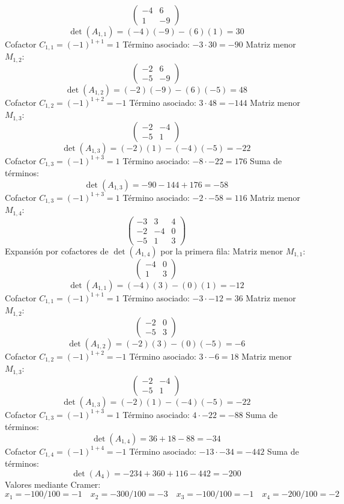\documentclass{article}
\begin{document}
\[\begin{pmatrix}-4 & 6 \\ 1 & -9\end{pmatrix}\]
\[\det(A_{1,1}) = (-4)(-9) - (6)(1) = 30\]
Cofactor $C_{1,1} = (-1)^{1+1} = 1$
Término asociado: $ -3 \cdot 30 = -90 $
Matriz menor $M_{1,2}$:
\[\begin{pmatrix}-2 & 6 \\ -5 & -9\end{pmatrix}\]
\[\det(A_{1,2}) = (-2)(-9) - (6)(-5) = 48\]
Cofactor $C_{1,2} = (-1)^{1+2} = -1$
Término asociado: $ 3 \cdot 48 = -144 $
Matriz menor $M_{1,3}$:
\[\begin{pmatrix}-2 & -4 \\ -5 & 1\end{pmatrix}\]
\[\det(A_{1,3}) = (-2)(1) - (-4)(-5) = -22\]
Cofactor $C_{1,3} = (-1)^{1+3} = 1$
Término asociado: $ -8 \cdot -22 = 176 $
Suma de términos:
\[\det(A_{1,3}) = -90 - 144 + 176 = -58\]
Cofactor $C_{1,3} = (-1)^{1+3} = 1$
Término asociado: $ -2 \cdot -58 = 116 $
Matriz menor $M_{1,4}$:
\[\begin{pmatrix}-3 & 3 & 4 \\ -2 & -4 & 0 \\ -5 & 1 & 3\end{pmatrix}\]
Expansión por cofactores de $\det(A_{1,4})$ por la primera fila:
Matriz menor $M_{1,1}$:
\[\begin{pmatrix}-4 & 0 \\ 1 & 3\end{pmatrix}\]
\[\det(A_{1,1}) = (-4)(3) - (0)(1) = -12\]
Cofactor $C_{1,1} = (-1)^{1+1} = 1$
Término asociado: $ -3 \cdot -12 = 36 $
Matriz menor $M_{1,2}$:
\[\begin{pmatrix}-2 & 0 \\ -5 & 3\end{pmatrix}\]
\[\det(A_{1,2}) = (-2)(3) - (0)(-5) = -6\]
Cofactor $C_{1,2} = (-1)^{1+2} = -1$
Término asociado: $ 3 \cdot -6 = 18 $
Matriz menor $M_{1,3}$:
\[\begin{pmatrix}-2 & -4 \\ -5 & 1\end{pmatrix}\]
\[\det(A_{1,3}) = (-2)(1) - (-4)(-5) = -22\]
Cofactor $C_{1,3} = (-1)^{1+3} = 1$
Término asociado: $ 4 \cdot -22 = -88 $
Suma de términos:
\[\det(A_{1,4}) = 36 + 18 - 88 = -34\]
Cofactor $C_{1,4} = (-1)^{1+4} = -1$
Término asociado: $ -13 \cdot -34 = -442 $
Suma de términos:
\[\det(A_{4}) = -234 + 360 + 116 - 442 = -200\]
Valores mediante Cramer:
\[x_1 = -100/100 = -1\quad x_2 = -300/100 = -3\quad x_3 = -100/100 = -1\quad x_4 = -200/100 = -2\]
\end{document}
